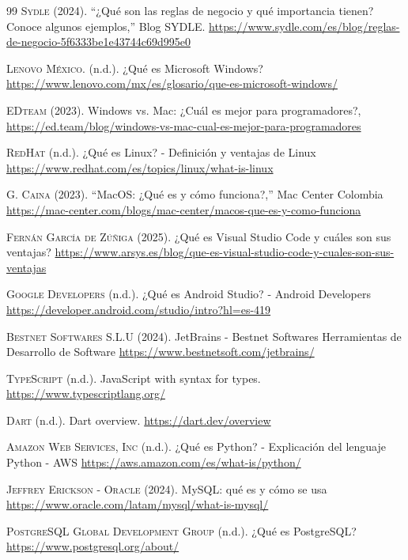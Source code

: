 \begin{thebibliography}{99}
\textsc{Sydle} (2024). “¿Qué son las reglas de negocio y qué importancia tienen? Conoce algunos ejemplos,” Blog SYDLE.
\url{https://www.sydle.com/es/blog/reglas-de-negocio-5f6333be1e43744c69d995e0}

\textsc{Lenovo México.} (n.d.). ¿Qué es Microsoft Windows? 
\url{https://www.lenovo.com/mx/es/glosario/que-es-microsoft-windows/}

\textsc{EDteam} (2023). Windows vs. Mac: ¿Cuál es mejor para programadores?,
\url{https://ed.team/blog/windows-vs-mac-cual-es-mejor-para-programadores}

\textsc{RedHat} (n.d.). ¿Qué es Linux? - Definición y ventajas de Linux
\url{https://www.redhat.com/es/topics/linux/what-is-linux}

\textsc{G. Caina} (2023). “MacOS: ¿Qué es y cómo funciona?,” Mac Center Colombia
\url{https://mac-center.com/blogs/mac-center/macos-que-es-y-como-funciona}

\textsc{Fernán García de Zúñiga} (2025). ¿Qué es Visual Studio Code y cuáles son sus ventajas?
\url{https://www.arsys.es/blog/que-es-visual-studio-code-y-cuales-son-sus-ventajas}

\textsc{Google Developers} (n.d.). ¿Qué es Android Studio? - Android Developers
\url{https://developer.android.com/studio/intro?hl=es-419}

\textsc{Bestnet Softwares S.L.U} (2024). JetBrains - Bestnet Softwares Herramientas de Desarrollo de Software
\url{https://www.bestnetsoft.com/jetbrains/}

\textsc{TypeScript} (n.d.). JavaScript with syntax for types.
\url{https://www.typescriptlang.org/}

\textsc{Dart} (n.d.). Dart overview.
\url{https://dart.dev/overview}

\textsc{Amazon Web Services, Inc} (n.d.). ¿Qué es Python? - Explicación del lenguaje Python - AWS
\url{https://aws.amazon.com/es/what-is/python/}

\textsc{Jeffrey Erickson - Oracle} (2024). MySQL: qué es y cómo se usa
\url{https://www.oracle.com/latam/mysql/what-is-mysql/}

\textsc{PostgreSQL Global Development Group} (n.d.). ¿Qué es PostgreSQL?
\url{https://www.postgresql.org/about/}


\end{thebibliography}
